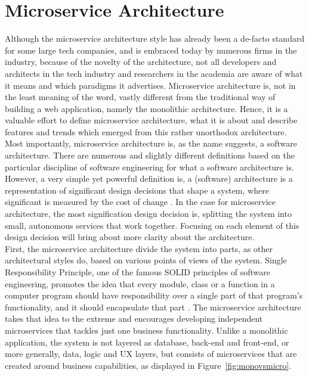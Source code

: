 \documentclass{Configuration_Files/PoliMi3i_thesis}
\begin{document}
\section{Microservice Architecture}
\label{sec:ms_arch}

Although the microservice architecture style has already been a de-facto standard for some large tech companies, and is embraced today by numerous firms in the industry, because of the novelty of the architecture, not all developers and architects in the tech industry and researchers in the academia are aware of what it means and which paradigms it advertises.
Microservice architecture is, not in the least meaning of the word, vastly different from the traditional way of building a web application, namely the monolithic architecture.
Hence, it is a valuable effort to define microservice architecture, what it is about and describe features and trends which emerged from this rather unorthodox architecture.
\\
Most importantly, microservice architecture is, as the name suggests, a software architecture.
There are numerous and slightly different definitions based on the particular discipline of software engineering for what a software architecture is.
However, a very simple yet powerful definition is, a (software) architecture is a representation of significant design decisions that shape a system, where significant is measured by the cost of change \cite{booch}. 
In the case for microservice architecture, the most signification design decision is, splitting the system into small, autonomous services that work together.
Focusing on each element of this design decision will bring about more clarity about the architecture.
\\
First, the microservice architecture divide the system into parts, as other architectural styles do, based on various points of views of the system.
Single Responsibility Principle, one of the famous SOLID principles of software engineering, promotes the idea that every module, class or a function in a computer program should have responsibility over a single part of that program's functionality, and it should encapsulate that part \cite{srp}.
The microservice architecture takes that idea to the extreme and encourages developing independent microservices that tackles just one business functionality.
Unlike a monolithic application, the system is not layered as database, back-end and front-end, or more generally, data, logic and UX layers, but consists of microservices that are created around business capabilities, as displayed in Figure~\ref{fig:monovsmicro}.
\end{document}
